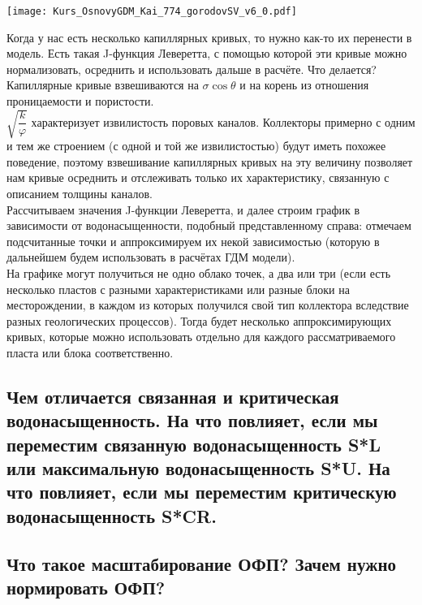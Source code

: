 \documentclass[main.tex]{subfiles}
\begin{document}
\texttt{[image: Kurs\_OsnovyGDM\_Kai\_774\_gorodovSV\_v6\_0.pdf]}

Когда у нас есть несколько капиллярных кривых, то нужно как-то их перенести в модель.
Есть такая J-функция Леверетта, с помощью которой эти кривые можно нормализовать, осреднить и использовать дальше в расчёте.
Что делается? Капиллярные кривые взвешиваются на $\sigma \cos\theta$ и на корень из отношения проницаемости и пористости.
\\

$\sqrt{\dfrac{k}{\varphi}}$ характеризует извилистость поровых каналов.
Коллекторы примерно с одним и тем же строением (с одной и той же извилистостью) будут иметь похожее поведение, поэтому взвешивание капиллярных кривых на эту величину позволяет нам кривые осреднить и отслеживать только их характеристику, связанную с описанием толщины каналов.
\\

Рассчитываем значения J-функции Леверетта, и далее строим график в зависимости от водонасыщенности, подобный представленному справа: отмечаем подсчитанные точки и аппроксимируем их некой зависимостью (которую в дальнейшем будем использовать в расчётах ГДМ модели).
\\

На графике могут получиться не одно облако точек, а два или три (если есть несколько пластов с разными характеристиками или разные блоки на месторождении, в каждом из которых получился свой тип коллектора вследствие разных геологических процессов).
Тогда будет несколько аппроксимирующих кривых, которые можно использовать отдельно для каждого рассматриваемого пласта или блока соответственно.

\newpage

\subsection{Чем отличается связанная и критическая водонасыщенность. На что повлияет, если мы переместим связанную водонасыщенность S*L или максимальную водонасыщенность S*U. На что повлияет, если мы переместим критическую водонасыщенность S*CR.}

\newpage

\subsection{Что такое масштабирование ОФП? Зачем нужно нормировать ОФП?}

\newpage
\end{document}
